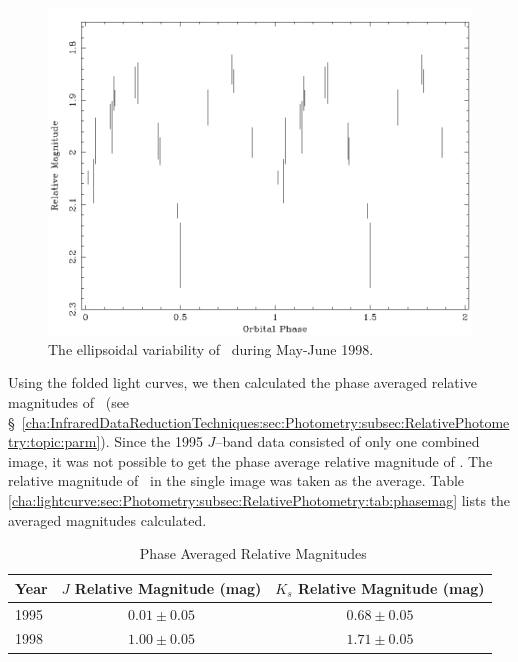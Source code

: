 \begin{figure}[!htb]
\begin{center}
\includegraphics[width=5.0in]{kctio98plot}
\caption{%
The ellipsoidal variability of \groj\ during May-June 1998. %
}\label{cha:lightcurve:sec:Photometry:subsec:RelativePhotometry:fig:kctio98plot}
\end{center}
\end{figure}

\vspace{\myparskip}

Using the folded light curves, we then calculated the phase averaged relative magnitudes of \groj\ (see \S~\ref{cha:InfraredDataReductionTechniques:sec:Photometry:subsec:RelativePhotometry:topic:parm}). Since the 1995 $J$--band data consisted of only one combined image, it was not
possible to get the phase average relative magnitude of \groj. The
relative magnitude of \groj\ in the single image was taken as the
average. Table~%
\vref{cha:lightcurve:sec:Photometry:subsec:RelativePhotometry:tab:phasemag}
lists the averaged magnitudes calculated.

\begin{table}[htb]
\caption{\groj\ Phase Averaged Relative Magnitudes}\label{cha:lightcurve:sec:Photometry:subsec:RelativePhotometry:tab:phasemag}

\begin{minipage}{\linewidth}
\renewcommand{\thefootnote}{\thempfootnote}

\begin{center}
\begin{tabular}{|l||||c|c|}

\hline
Year & $J$ Relative Magnitude (mag) & $K_s$ Relative Magnitude (mag) \\\hline\hline\hline\hline
1995 & $0.01\pm0.05$ & $0.68\pm0.05$ \\\hline
1998 & $1.00\pm0.05$ & $1.71\pm0.05$ \\\hline
\hline
\end{tabular}
\end{center}
\end{minipage}
\end{table}

